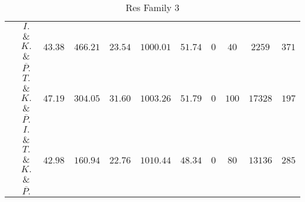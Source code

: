 \documentclass{article}
\begin{document}
\begin{table}[!htb]
{\begin{tabular}{|c|c|c|cc|cccccc|}
                             & $I.$ \& $K.$ \& $\overline{P.}$  &$43.38$ & $466.21$ & $23.54$ & $1000.01$ & $51.74$ & $0$ & $40$ & $2259$ & $371 $ \\ 
                             & $T.$ \& $K.$ \& $\overline{P.}$  &$47.19$ & $304.05$ & $31.60$ & $1003.26$ & $51.79$ & $0$ & $100$ & $17328$ & $197 $ \\ 
                             & $I.$ \& $T.$ \& $K.$ \& $\overline{P.}$  &$42.98$ & $160.94$ & $22.76$ & $1010.44$ & $48.34$ & $0$ & $80$ & $13136$ & $285 $ \\ 
    \hline
  \end{tabular}}
\caption{Res Family 3}
\end{table}
\end{document}
